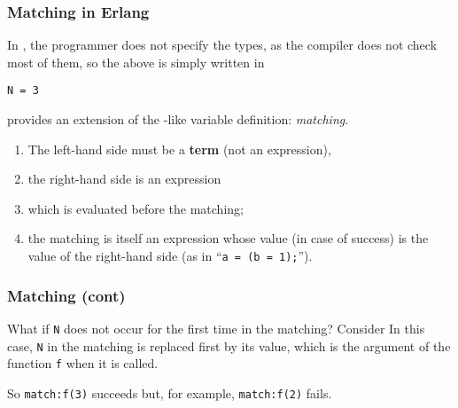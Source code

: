%
\begin{frame}[containsverbatim]
\frametitle{Matching in Erlang}

In \Erlang, the programmer does not specify the types, as the compiler
does not check most of them, so the above is simply written in \Erlang
\begin{verbatim}
N = 3
\end{verbatim}
\Erlang provides an extension of the \Java-like variable definition:
\emph{matching}.
\begin{enumerate}

  \item The left-hand side must be a \textbf{term} (not an
    expression),

  \item the right-hand side is an expression

  \item which is evaluated before the matching;

  \item the matching is itself an expression whose
    value (in case of success) is the value of the right-hand side (as
    in \cpp{} ``\texttt{a = (b = 1);}'').

\end{enumerate}

\end{frame}

%
\begin{frame}
\frametitle{Matching (cont)}

What if \texttt{N} does not occur for the first time in the matching?
Consider
In this case, \texttt{N} in the matching is replaced first by its
value, which is the argument of the function \texttt{f} when it is
called. 

\bigskip

So \texttt{match:f(3)} succeeds but, for example, \texttt{match:f(2)}
fails.

\end{frame}

